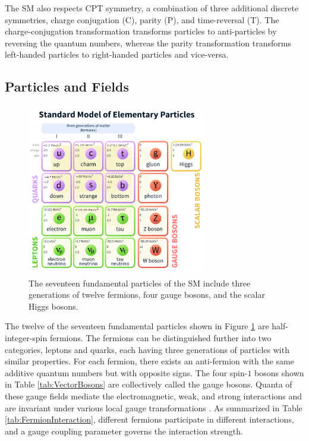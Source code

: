 The SM also respects CPT symmetry, a combination of three additional discrete symmetries, charge conjugation (C), parity (P), and time-reversal (T). The charge-conjugation transformation transforms particles to anti-particles by reversing the quantum numbers, whereas the parity transformation transforms left-handed particles to right-handed particles and vice-versa.

\subsection{Particles and Fields}
\label{subsec:Constituents}

\begin{figure}[!htb]
    \centering
    \includegraphics[width=0.7\textwidth] {figures/Theory/SMparticles.pdf}\hspace{1cm}
    \caption{ The seventeen fundamental particles of the SM include three generations of twelve fermions, four gauge bosons, and the scalar Higgs bosons. \cite{SMFigureWiki}}
    \label{fig:SM}
\end{figure}

The twelve of the seventeen fundamental particles shown in Figure \ref{fig:SM} are half-integer-spin fermions. The fermions can be distinguished further into two categories, leptons and quarks, each having three generations of particles with similar properties. For each fermion, there exists an anti-fermion with the same additive quantum numbers but with opposite signs. The four spin-$1$ bosons shown in Table \ref{tab:VectorBosons} are collectively called the gauge bosons. Quanta of these gauge fields mediate the electromagnetic, weak, and strong interactions and are invariant under various local gauge transformations \cite{Bernabeu2021}. As summarized in Table \ref{tab:FermionInteraction}, different fermions participate in different interactions, and a gauge coupling parameter governs the interaction strength.

